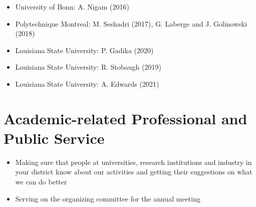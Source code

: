 \documentclass[11pt,a4paper,sans]{moderncv}
\begin{document}
\begin{itemize}[leftmargin=4cm]
\item University of Bonn: A. Nigam (2016)
\item Polytechnique Montreal:  M. Seshadri (2017), G. Laberge and J. Golinowski (2018)
\item Louisiana State University: P. Gadika (2020)
\end{itemize}

\begin{itemize}[leftmargin=4cm]
\item Louisiana State University: R. Stobaugh (2019)
\end{itemize}

\begin{itemize}[leftmargin=4cm]
\item Louisiana State University: A. Edwards (2021)
\end{itemize}


\section{Academic-related Professional and Public Service}

\begin{itemize}[leftmargin=4cm]
\item Making sure that people at universities, research institutions and industry in your district know
  about our activities and getting their suggestions on what we can do better
\item Serving on the organizing committee for the annual meeting
\end{itemize}

\end{document}
